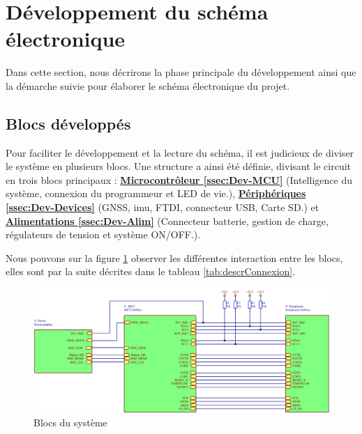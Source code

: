\section{Développement du schéma électronique} \label{sec:Dev-Schematique}
Dans cette section, nous décrirons la phase principale du développement ainsi que la démarche suivie pour élaborer le schéma électronique du projet.

\subsection{Blocs développés} \label{ssec:Dev-blocs}
Pour faciliter le développement et la lecture du schéma, il est judicieux de diviser le système en plusieurs blocs. Une structure a ainsi été définie, divisant le circuit en trois blocs principaux : \hyperref[ssec:Dev-MCU]{\textbf{Microcontrôleur \ref{ssec:Dev-MCU}}} (Intelligence du système, connexion du programmeur et LED de vie.), \hyperref[ssec:Dev-Devices]{\textbf{Périphériques \ref{ssec:Dev-Devices}}} (\gls{GNSS}, \gls{imu}, \gls{FTDI}, connecteur USB, Carte SD.) et \hyperref[ssec:Dev-Alim]{\textbf{Alimentations \ref{ssec:Dev-Alim}}} (Connecteur batterie, gestion de charge, régulateurs de tension et système ON/OFF.).

Nous pouvons sur la figure \ref{fig:blocs} observer les différentes interaction entre les blocs, elles sont par la suite décrites dans le tableau \ref{tab:descrConnexion}.

\begin{figure}[h]
	\centering
	\includegraphics[width=.95\linewidth]{../figures/etude/sch/BLOCS}
	\caption{Blocs du système}
	\label{fig:blocs}
\end{figure}

